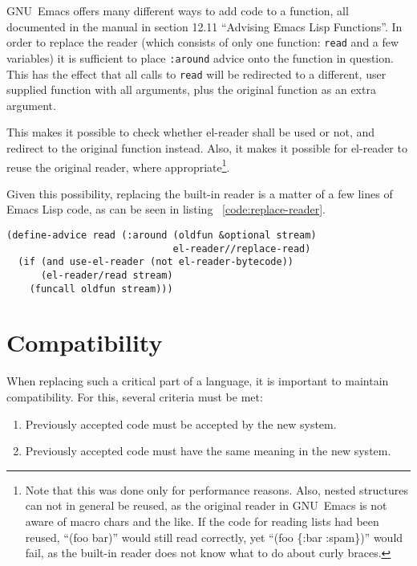 \documentclass[a4paper,10pt,twoside]{report}
\newcommand{\el}{Emacs Lisp}
\newcommand{\elr}{el-reader}
\newcommand{\sym}[1]{\texttt{#1}}
\newcommand{\fun}[1]{\texttt{#1}}
\newcommand{\emacs}{GNU~Emacs}
\begin{document}
\emacs{} offers many different ways to add code to a function, all documented in
the manual in section 12.11 ``Advising Emacs Lisp
Functions''\cite{elisp-reference}.  In order to replace the reader (which
consists of only one function: \fun{read} and a few variables) it is sufficient
to place \sym{:around} advice onto the function in question.  This has the
effect that all calls to \fun{read} will be redirected to a different, user
supplied function with all arguments, plus the original function as an extra
argument.

This makes it possible to check whether \elr{} shall be used or not, and
redirect to the original function instead.  Also, it makes it possible for
\elr{} to reuse the original reader, where appropriate\footnote{Note that this
  was done only for performance reasons.  Also, nested structures can not in
  general be reused, as the original reader in \emacs{} is not aware of macro
  chars and the like.  If the code for reading lists had been reused, ``(foo
  bar)'' would still read correctly, yet ``(foo \{:bar :spam\})'' would fail, as
  the built-in reader does not know what to do about curly braces.}.

Given this possibility, replacing the built-in reader is a matter of a few lines
of \el{} code, as can be seen in listing ~\ref{code:replace-reader}.

\begin{lstlisting}[style=lispcode,caption={Replacing the built-in
    reader},label={code:replace-reader}]
(define-advice read (:around (oldfun &optional stream)
                             el-reader//replace-read)
  (if (and use-el-reader (not el-reader-bytecode))
      (el-reader/read stream)
    (funcall oldfun stream)))
\end{lstlisting}

\section{Compatibility}
\label{subsec:compat}

When replacing such a critical part of a language, it is important to maintain
compatibility.  For this, several criteria must be met:

\begin{enumerate}
\item Previously accepted code must be accepted by the new system.
\item Previously accepted code must have the same meaning in the new system.
\end{enumerate}
\end{document}

